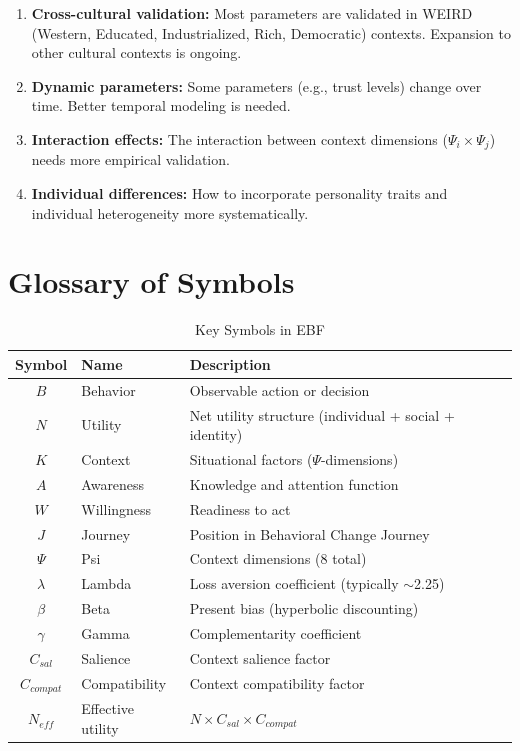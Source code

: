 \begin{enumerate}
\item \textbf{Cross-cultural validation:} Most parameters are validated
      in WEIRD (Western, Educated, Industrialized, Rich, Democratic) contexts.
      Expansion to other cultural contexts is ongoing.

\item \textbf{Dynamic parameters:} Some parameters (e.g., trust levels)
      change over time. Better temporal modeling is needed.

\item \textbf{Interaction effects:} The interaction between context
      dimensions ($\Psi_i \times \Psi_j$) needs more empirical validation.

\item \textbf{Individual differences:} How to incorporate personality
      traits and individual heterogeneity more systematically.
\end{enumerate}


\section{Glossary of Symbols}
\label{sec:ref-ebf-glossary}

\begin{table}[htbp]
\centering
\caption{Key Symbols in EBF}
\label{tab:symbols}
\renewcommand{\arraystretch}{1.3}
\begin{tabular}{@{}cll@{}}
\toprule
\textbf{Symbol} & \textbf{Name} & \textbf{Description} \\
\midrule
$B$ & Behavior & Observable action or decision \\
$N$ & Utility & Net utility structure (individual + social + identity) \\
$K$ & Context & Situational factors ($\Psi$-dimensions) \\
$A$ & Awareness & Knowledge and attention function \\
$W$ & Willingness & Readiness to act \\
$J$ & Journey & Position in Behavioral Change Journey \\
$\Psi$ & Psi & Context dimensions (8 total) \\
$\lambda$ & Lambda & Loss aversion coefficient (typically $\sim$2.25) \\
$\beta$ & Beta & Present bias (hyperbolic discounting) \\
$\gamma$ & Gamma & Complementarity coefficient \\
$C_{sal}$ & Salience & Context salience factor \\
$C_{compat}$ & Compatibility & Context compatibility factor \\
$N_{eff}$ & Effective utility & $N \times C_{sal} \times C_{compat}$ \\
\bottomrule
\end{tabular}
\end{table}

